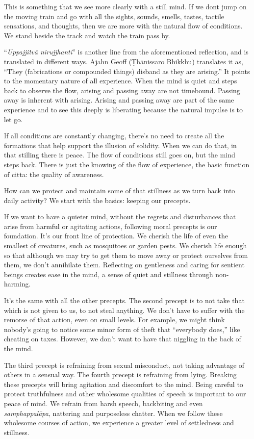 This is something that we see more clearly with a still mind. If we don\textquotesingle t jump on the moving train and go with all the sights, sounds, smells, tastes, tactile sensations, and thoughts, then we are more with the natural flow of conditions. We stand beside the track and watch the train pass by.~

``\emph{Uppajjitvā nirujjhanti}'' is another line from the aforementioned reflection, and is translated in different ways. Ajahn Geoff (Ṭhānissaro Bhikkhu) translates it as, ``They (fabrications or compounded things) disband as they are arising.'' It points to the momentary nature of all experience. When the mind is quiet and steps back to observe the flow, arising and passing away are not timebound. Passing away is inherent with arising. Arising and passing away are part of the same experience and to see this deeply is liberating because the natural impulse is to let go.

If all conditions are constantly changing, there's no need to create all the formations that help support the illusion of solidity. When we can do that, in that stilling there is peace. The flow of conditions still goes on, but the mind steps back. There is just the knowing of the flow of experience, the basic function of citta: the quality of awareness.~

How can we protect and maintain some of that stillness as we turn back into daily activity? We start with the basics: keeping our precepts.

If we want to have a quieter mind, without the regrets and disturbances that arise from harmful or agitating actions, following moral precepts is our foundation. It's our front line of protection. We cherish the life of even the smallest of creatures, such as mosquitoes or garden pests. We cherish life enough so that although we may try to get them to move away or protect ourselves from them, we don't annihilate them. Reflecting on gentleness and caring for sentient beings creates ease in the mind, a sense of quiet and stillness through non-harming.~

It's the same with all the other precepts. The second precept is to not take that which is not given to us, to not steal anything. We don't have to suffer with the remorse of that action, even on small levels. For example, we might think nobody's going to notice some minor form of theft that ``everybody does,'' like cheating on taxes. However, we don't want to have that niggling in the back of the mind.

The third precept is refraining from sexual misconduct, not taking advantage of others in a sensual way. The fourth precept is refraining from lying. Breaking these precepts will bring agitation and discomfort to the mind. Being careful to protect truthfulness and other wholesome qualities of speech is important to our peace of mind. We refrain from harsh speech, backbiting and even \emph{samphappalāpa}, nattering and purposeless chatter. When we follow these wholesome courses of action, we experience a greater level of settledness and stillness.

